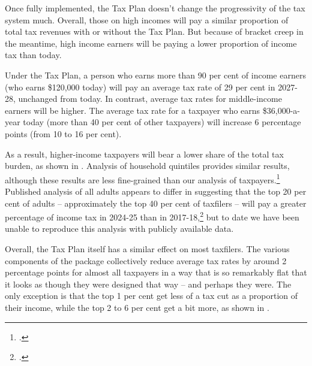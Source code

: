 \documentclass[submission]{grattan}
\begin{document}
Once fully implemented, the Tax Plan doesn't change the progressivity of the tax system much. Overall, those on high incomes will pay a similar proportion of total tax revenues with or without the Tax Plan. But because of bracket creep in the meantime, high income earners will be paying a lower proportion of income tax than today.





Under the Tax Plan, a person who earns more than 90 per cent of income earners (who earns \$120,000 today) will pay an average tax rate of 29 per cent in 2027-28, unchanged from today. In contrast, average tax rates for middle-income earners will be higher. The average tax rate for a taxpayer who earns \$36,000-a-year today (more than 40 per cent of other taxpayers) will increase 6 percentage points (from 10 to 16 per cent).

As a result, higher-income taxpayers will bear a lower share of the total tax burden, as shown in . Analysis of household quintiles provides similar results, although these results are less fine-grained than our analysis of taxpayers.\footcite{Phillips2018}
Published analysis of all adults appears to differ in suggesting that the top 20 per cent of adults -- approximately the top 40 per cent of taxfilers -- will pay a greater percentage of income tax in 2024-25 than in 2017-18,\footcite{Greber} but to date we have been unable to reproduce this analysis with publicly available data.

Overall, the Tax Plan itself has a similar effect on most taxfilers. The various components of the package collectively reduce average tax rates by around 2 percentage points for almost all taxpayers in a way that is so remarkably flat that it looks as though they were designed that way -- and perhaps they were. The only exception is that the top 1 per cent get less of a tax cut as a proportion of their income, while the top 2 to 6 per cent get a bit more, as shown in .
\end{document}
